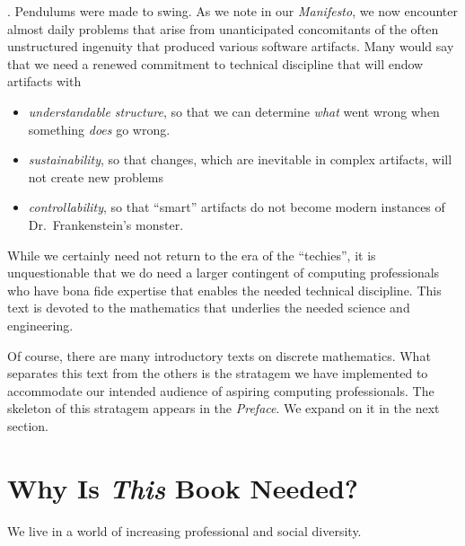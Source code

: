 .
Pendulums were made to swing.  As we note in our {\it Manifesto}, we
now encounter almost daily problems that arise from unanticipated
concomitants of the often unstructured ingenuity that produced various
software artifacts.  Many would say that we need a renewed commitment
to technical discipline that will endow artifacts with
\begin{itemize}
\item
{\em understandable structure}, so that we can determine {\em what} went
wrong when something {\em does} go wrong.
\item
{\em sustainability}, so that changes, which are inevitable in complex
artifacts, will not create new problems
\item
{\em controllability}, so that ``smart'' artifacts do not become
modern instances of Dr.~Frankenstein's monster.
\end{itemize}
While we certainly need not return to the era of the ``techies'', it
is unquestionable that we do need a larger contingent of computing
professionals who have bona fide expertise that enables the needed
technical discipline.  This text is devoted to the mathematics that
underlies the needed science and engineering.

\bigskip

Of course, there are many introductory texts on discrete mathematics.
What separates this text from the others is the stratagem we have
implemented to accommodate our intended audience of aspiring computing
professionals.  The skeleton of this stratagem appears in the {\it
  Preface}.  We expand on it in the next section.



\section{Why Is {\em This} Book Needed?}
\label{sec:thisbookneed}

We live in a world of increasing professional and social diversity.

\medskip

